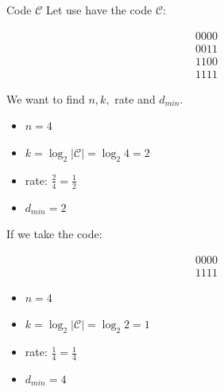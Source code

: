 
\begin{parag}{Code $\mathcal{C}$}
    Let use have the code $\mathcal{C}$:
    \begin{minipage}{0.5\textwidth}
    \begin{align*} 0000\\0011\\1100\\1111 \end{align*}
    \end{minipage}
    \begin{minipage}{0.5\textwidth}
    We want to find $n, k, $ rate and $d_{min}$.
    \begin{itemize}
        \item $n = 4$
        \item $k = \log_2 \left|\mathcal{C}\right| = \log_2 4 = 2$
        \item rate: $\frac{2}{4} = \frac{1}{2}$
        \item $d_{min} = 2$
    \end{itemize}
\end{minipage} 

    If we take the code:
    \begin{minipage}{0.5\textwidth}
    \begin{align*} 0000\\ 1111 \end{align*}
    \end{minipage}
    \begin{minipage}{0.5\textwidth}
    \begin{itemize}
        \item $n = 4$
        \item $k = \log_2 \left|\mathcal{C}\right| = \log_2 2 = 1$
        \item rate: $\frac{1}{4} = \frac{1}{4}$
        \item $d_{min} = 4$
    \end{itemize}
\end{minipage} 
 

\end{parag}
